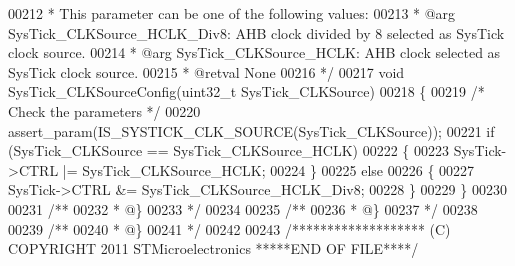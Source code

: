 \begin{DoxyCode}
00212 \textcolor{comment}{  *   This parameter can be one of the following values:}
00213 \textcolor{comment}{  *     @arg SysTick\_CLKSource\_HCLK\_Div8: AHB clock divided by 8 selected as SysTick clock source.}
00214 \textcolor{comment}{  *     @arg SysTick\_CLKSource\_HCLK: AHB clock selected as SysTick clock source.}
00215 \textcolor{comment}{  * @retval None}
00216 \textcolor{comment}{  */}
00217 \textcolor{keywordtype}{void} SysTick_CLKSourceConfig(uint32\_t SysTick\_CLKSource)
00218 \{
00219   \textcolor{comment}{/* Check the parameters */}
00220   assert_param(IS\_SYSTICK\_CLK\_SOURCE(SysTick\_CLKSource));
00221   \textcolor{keywordflow}{if} (SysTick\_CLKSource == SysTick_CLKSource_HCLK)
00222   \{
00223     SysTick->CTRL |= SysTick_CLKSource_HCLK;
00224   \}
00225   \textcolor{keywordflow}{else}
00226   \{
00227     SysTick->CTRL &= SysTick_CLKSource_HCLK_Div8;
00228   \}
00229 \}
00230 
00231 \textcolor{comment}{/**}
00232 \textcolor{comment}{  * @\}}
00233 \textcolor{comment}{  */}
00234 
00235 \textcolor{comment}{/**}
00236 \textcolor{comment}{  * @\}}
00237 \textcolor{comment}{  */}
00238 
00239 \textcolor{comment}{/**}
00240 \textcolor{comment}{  * @\}}
00241 \textcolor{comment}{  */}
00242 
00243 \textcolor{comment}{/******************* (C) COPYRIGHT 2011 STMicroelectronics *****END OF FILE****/}
\end{DoxyCode}
